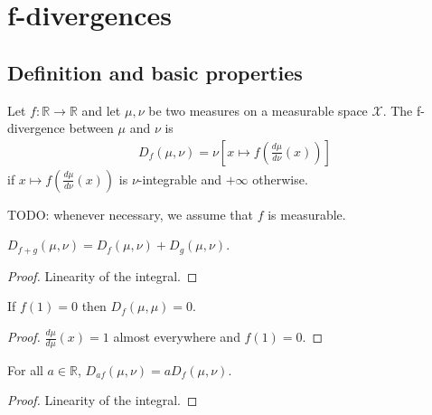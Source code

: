 \chapter{f-divergences}

\section{Definition and basic properties}

\begin{definition}[f-divergence]
  \label{def:fDiv}
  \leanok
  Let $f : \mathbb{R} \to \mathbb{R}$ and let $\mu, \nu$ be two measures on a measurable space $\mathcal X$. The f-divergence between $\mu$ and $\nu$ is
  \begin{align*}
  D_f(\mu, \nu) = \nu\left[x \mapsto f\left(\frac{d \mu}{d \nu}(x)\right)\right]
  \end{align*}
  if $x \mapsto f\left(\frac{d \mu}{d \nu}(x)\right)$ is $\nu$-integrable and $+\infty$ otherwise.
\end{definition}

TODO: whenever necessary, we assume that $f$ is measurable.

\begin{lemma}
  \label{lem:fDiv_add}
  \leanok
  $D_{f + g}(\mu, \nu) = D_f(\mu, \nu) + D_g(\mu, \nu)$.
\end{lemma}

\begin{proof}
Linearity of the integral.
\end{proof}

\begin{lemma}
  \label{lem:fDiv_self}
  \leanok
  If $f(1) = 0$ then $D_{f}(\mu, \mu) = 0$.
\end{lemma}

\begin{proof} \leanok
$\frac{d \mu}{d \mu}(x) = 1$ almost everywhere and $f(1) = 0$.
\end{proof}

\begin{lemma}
  \label{lem:fDiv_mul}
  \leanok
  For all $a \in \mathbb{R}$, $D_{a f}(\mu, \nu) = a D_{f}(\mu, \nu)$.
\end{lemma}

\begin{proof} \leanok
Linearity of the integral.
\end{proof}

